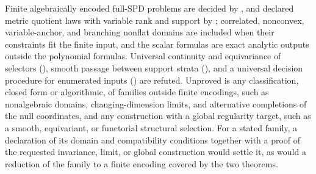 Finite algebraically encoded full-SPD problems are decided by
, and declared metric quotient
laws with variable rank and support by
; correlated, nonconvex,
variable-anchor, and branching nonflat domains are included when their
constraints fit the finite input, and the scalar formulas are exact analytic
outputs outside the polynomial formulas. Universal continuity and equivariance
of selectors (), smooth passage between
support strata (), and a
universal decision procedure for enumerated inputs
() are refuted. Unproved is any
classification, closed form or algorithmic, of families outside finite
encodings, such as nonalgebraic domains, changing-dimension limits, and
alternative completions of the null coordinates, and any construction with a
global regularity target, such as a smooth, equivariant, or functorial
structural selection. For a stated family, a declaration of its domain and
compatibility conditions together with a proof of the requested invariance,
limit, or global construction would settle it, as would a reduction of the
family to a finite encoding covered by the two theorems.
